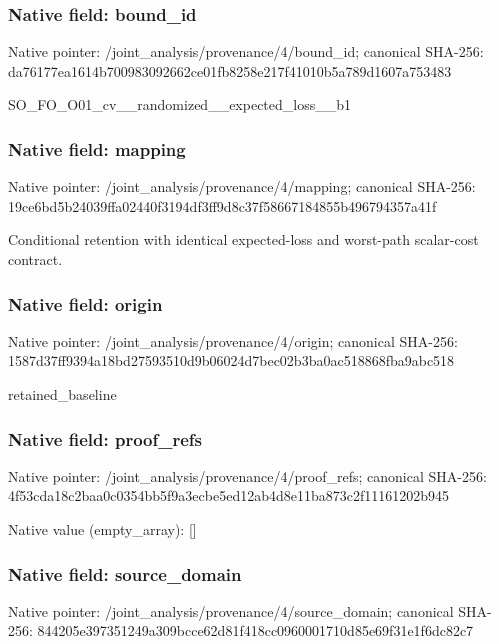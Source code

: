\documentclass[10pt,a4paper]{article}
\begin{document}
\subsubsection{Native field: bound\_\allowbreak{}id}
Native pointer: /joint\_\allowbreak{}analysis/provenance/4/bound\_\allowbreak{}id; canonical SHA-256: da76177ea1614b700983092662ce01fb8258e217f41010b5a789d1607a753483

\begingroup\raggedright\sloppy SO\_\allowbreak{}FO\_\allowbreak{}O01\_\allowbreak{}cv\_\allowbreak{}\_\allowbreak{}randomized\_\allowbreak{}\_\allowbreak{}expected\_\allowbreak{}loss\_\allowbreak{}\_\allowbreak{}b1\par\endgroup

\subsubsection{Native field: mapping}
Native pointer: /joint\_\allowbreak{}analysis/provenance/4/mapping; canonical SHA-256: 19ce6bd5b24039ffa02440f3194df3ff9d8c37f58667184855b496794357a41f

\begingroup\raggedright\sloppy Conditional retention with identical expected-loss and worst-path scalar-cost contract.\par\endgroup

\subsubsection{Native field: origin}
Native pointer: /joint\_\allowbreak{}analysis/provenance/4/origin; canonical SHA-256: 1587d37ff9394a18bd27593510d9b06024d7bec02b3ba0ac518868fba9abc518

\begingroup\raggedright\sloppy retained\_\allowbreak{}baseline\par\endgroup

\subsubsection{Native field: proof\_\allowbreak{}refs}
Native pointer: /joint\_\allowbreak{}analysis/provenance/4/proof\_\allowbreak{}refs; canonical SHA-256: 4f53cda18c2baa0c0354bb5f9a3ecbe5ed12ab4d8e11ba873c2f11161202b945

Native value (empty\_\allowbreak{}array): []

\subsubsection{Native field: source\_\allowbreak{}domain}
Native pointer: /joint\_\allowbreak{}analysis/provenance/4/source\_\allowbreak{}domain; canonical SHA-256: 844205e397351249a309bcce62d81f418cc0960001710d85e69f31e1f6dc82c7
\end{document}
